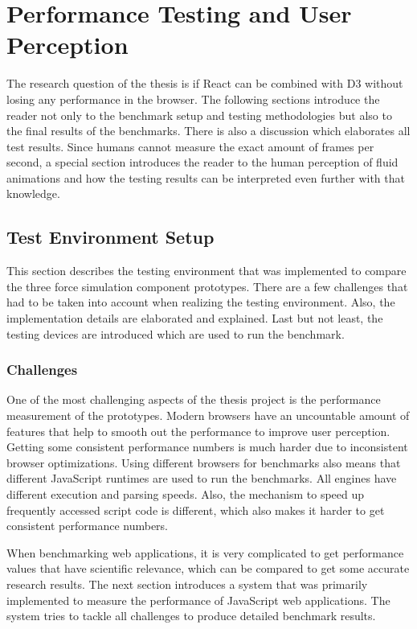 \chapter{Performance Testing and User Perception}
\label{cha:performance}

The research question of the thesis is if React can be combined with D3 without losing any performance in the browser. The following sections introduce the reader not only to the benchmark setup and testing methodologies but also to the final results of the benchmarks. There is also a discussion which elaborates all test results. Since humans cannot measure the exact amount of frames per second, a special section introduces the reader to the human perception of fluid animations and how the testing results can be interpreted even further with that knowledge.

\section{Test Environment Setup}

This section describes the testing environment that was implemented to compare the three force simulation component prototypes. There are a few challenges that had to be taken into account when realizing the testing environment. Also, the implementation details are elaborated and explained. Last but not least, the testing devices are introduced which are used to run the benchmark.

\subsection{Challenges}

One of the most challenging aspects of the thesis project is the performance measurement of the prototypes. Modern browsers have an uncountable amount of features that help to smooth out the performance to improve user perception. Getting some consistent performance numbers is much harder due to inconsistent browser optimizations. Using different browsers for benchmarks also means that different JavaScript runtimes are used to run the benchmarks. All engines have different execution and parsing speeds. Also, the mechanism to speed up frequently accessed script code is different, which also makes it harder to get consistent performance numbers.

When benchmarking web applications, it is very complicated to get performance values that have scientific relevance, which can be compared to get some accurate research results. The next section introduces a system that was primarily implemented to measure the performance of JavaScript web applications. The system tries to tackle all challenges to produce detailed benchmark results.

